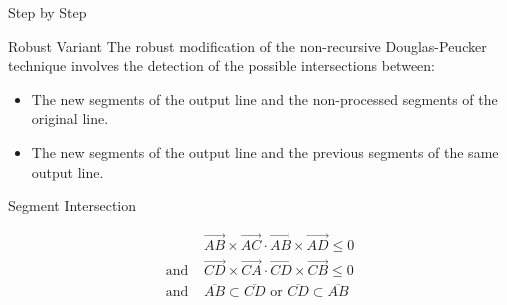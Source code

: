 \documentclass[10pt]{beamer}
\begin{document}
\begin{frame}{Step by Step}
	\begin{figure}[h]
	\end{figure}
\end{frame}


\begin{frame}{Robust Variant}
	The robust modification of the non-recursive Douglas-Peucker technique 
	involves the detection of the possible intersections between:
	\begin{itemize}
		\item The new segments of the output line and the non-processed
			  segments of the original line.
		\item The new segments of the output line and the previous 
			  segments of the same output line.
	\end{itemize}		
\end{frame}	

\begin{frame}{Segment Intersection}
	\begin{figure}[h]
	\end{figure}
	\begin{align*}
					&	\overrightarrow{AB}\times\overrightarrow{AC} \cdot \overrightarrow{AB}\times\overrightarrow{AD} \leq 0 \\
	  \text{and } 	&	\overrightarrow{CD}\times\overrightarrow{CA} \cdot \overrightarrow{CD}\times\overrightarrow{CB} \leq 0 \\
	  \text{and } 	&	\overline{AB} \subset \overline{CD} \text{ or }  \overline{CD}  \subset \overline{AB} 	  	
	\end{align*}

\end{frame}
\end{document}
